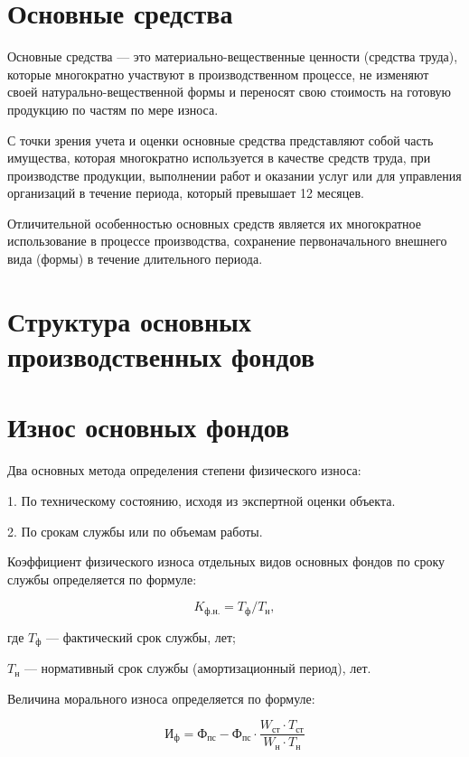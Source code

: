 \section{Основные средства}

Основные средства --- это материально-вещественные ценности (средства труда),
которые многократно участвуют в производственном процессе, не изменяют своей
натурально-вещественной формы и переносят свою стоимость на готовую продукцию по
частям по мере износа.

С точки зрения учета и оценки основные средства представляют собой часть
имущества, которая многократно используется в качестве средств труда, при
производстве продукции, выполнении работ и оказании услуг или для управления
организаций в течение периода, который превышает 12 месяцев.

Отличительной особенностью основных средств является их многократное
использование в процессе производства, сохранение первоначального внешнего вида
(формы) в течение длительного периода.

\section{Структура основных производственных фондов}

\section{Износ основных фондов}

Два основных метода определения степени физического износа:

1. По техническому состоянию, исходя из экспертной оценки объекта.

2. По срокам службы или по объемам работы.

Коэффициент физического износа отдельных видов основных фондов по сроку службы
определяется по формуле:

\begin{equation}
    K_{\text{ф.н.}} = T_{\text{ф}}/T_{\text{н}},
\end{equation}

где $T_{\text{ф}}$ --- фактический срок службы, лет;

$T_{\text{н}}$ --- нормативный срок службы (амортизационный период), лет.

Величина морального износа определяется по формуле:

\begin{equation}
    \text{И}_{\text{ф}} = \text{Ф}_{\text{пс}} - \text{Ф}_{\text{пс}} \cdot
    \frac{W_{\text{ст}} \cdot T_{\text{ст}}}{W_{\text{н}} \cdot T_{\text{н}}}
\end{equation}

